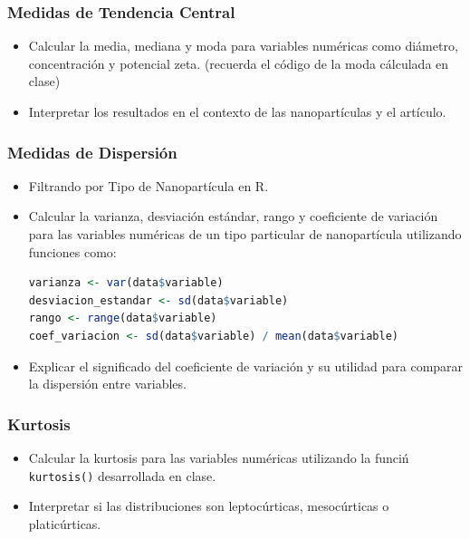 \documentclass{article}
\begin{document}
\subsubsection*{Medidas de Tendencia Central}
\begin{itemize}
    \item Calcular la media, mediana y moda para variables num\'ericas como di\'ametro, concentraci\'on y potencial zeta. (recuerda el código de la moda cálculada en clase)
    \item Interpretar los resultados en el contexto de las nanopart\'iculas y el art\'iculo.
\end{itemize}

\subsubsection*{Medidas de Dispersi\'on}
\begin{itemize}
    \item Filtrando por Tipo de Nanopart\'icula en R.
    \item Calcular la varianza, desviaci\'on est\'andar, rango y coeficiente de variaci\'on para las variables num\'ericas de un tipo particular de nanopart\'icula utilizando funciones como:
    \begin{lstlisting}[language=R]
varianza <- var(data$variable)
desviacion_estandar <- sd(data$variable)
rango <- range(data$variable)
coef_variacion <- sd(data$variable) / mean(data$variable)
    \end{lstlisting}
    \item Explicar el significado del coeficiente de variaci\'on y su utilidad para comparar la dispersión entre variables.
\end{itemize}

\subsubsection*{Kurtosis}
\begin{itemize}
    \item Calcular la kurtosis para las variables num\'ericas utilizando la funci\'n \texttt{kurtosis()} desarrollada en clase.
    \item Interpretar si las distribuciones son leptoc\'urticas, mesoc\'urticas o platic\'urticas.
\end{itemize}
\end{document}
